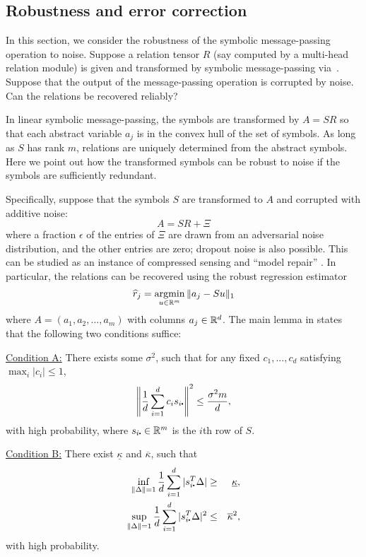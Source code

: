 \subsection{Robustness and error correction}

In this section, we consider the robustness of the symbolic message-passing operation to noise. Suppose a relation tensor $R$ (say computed by a multi-head relation module) is given and transformed by symbolic message-passing via~. Suppose that the output of the message-passing operation is corrupted by noise. Can the relations be recovered reliably?

In linear symbolic message-passing, the symbols are transformed by \(A = SR\) so that each abstract variable \(a_j\) is in the convex hull of the set of symbols. As long as \(S\) has rank \(m\), relations are uniquely determined from the abstract symbols. Here we point out how the transformed symbols can be robust to noise if the symbols are
sufficiently redundant.

Specifically, suppose that the symbols \(S\) are transformed to \(A\) and corrupted with additive noise:
\begin{equation}
  A = SR + \Xi
\end{equation}
where a fraction \(\epsilon\) of the entries of \(\Xi\) are drawn from an adversarial noise distribution, and the other entries are zero; dropout noise is also possible.
This can be studied as an instance of compressed sensing and ``model repair'' \citep{candes_randall,model_repair}.  In particular, the relations can be recovered using the  robust regression estimator
\begin{equation}
  \hat r_j = \argmin_{u \in\reals^m} \| a_j - S u\|_1 \label{eq:lp}
\end{equation}
where \(A = (a_1,a_2,\ldots, a_m)\) with columns \(a_j\in\mathbb{R}^d\).
The main lemma in \cite{model_repair} states that the following two conditions suffice:

\underline{Condition A:}
  There exists some \(\sigma^2\), such that for any fixed \(c_1,...,c_d\) satisfying \(\max_i|c_i|\leq 1\),
  \begin{equation}
    \left\|\frac{1}{d}\sum_{i=1}^d c_i s_{i\rdot} \right\|^2\leq \frac{\sigma^2 m}{d},
  \end{equation}
with high probability, where \(s_{i\rdot}\in\reals^m\) is the \(i\)th row of \(S\).

\underline{Condition B:}
  There exist \(\underline{\kappa}\) and \(\overline{\kappa}\), such that
  \begin{eqnarray}
  \label{eq:l1-upper-A} \inf_{\|\Delta\|=1}\frac{1}{d}\sum_{i=1}^d|s_{i\rdot}^T\Delta| &\geq& \underline{\kappa}, \\
  \label{eq:l2-upper-A} \sup_{\|\Delta\|=1}\frac{1}{d}\sum_{i=1}^d|s_{i\rdot}^T\Delta|^2 &\leq& \overline{\kappa}^2,
  \end{eqnarray}
  with high probability.

